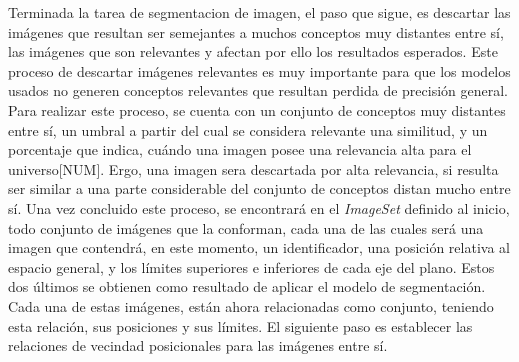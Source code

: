 Terminada la tarea de segmentacion de imagen, el paso que sigue, es descartar las imágenes que resultan ser semejantes a muchos conceptos muy distantes entre sí, las imágenes que son relevantes y afectan por ello los resultados esperados. Este proceso de descartar imágenes relevantes es muy importante para que los modelos usados no generen conceptos relevantes que resultan perdida de precisi\'on general. Para realizar este proceso, se cuenta con un conjunto de conceptos muy distantes entre sí, un umbral a partir del cual se considera relevante una similitud, y un porcentaje que indica, cu\'ando una imagen posee una relevancia alta para el universo[NUM]. Ergo, una imagen sera descartada por alta relevancia, si resulta ser similar a una parte considerable del conjunto de conceptos distan mucho entre s\'i.
Una vez concluido este proceso, se encontrará en el \textit{ImageSet} definido al inicio, todo conjunto de imágenes que la conforman, cada una de las cuales será una imagen que contendrá, en este momento, un identificador, una posición relativa al espacio general, y los límites superiores e inferiores de cada eje del plano. Estos dos últimos se obtienen como resultado de aplicar el modelo de segmentación. Cada una de estas imágenes, están ahora relacionadas como conjunto, teniendo esta relación, sus posiciones y sus límites. El siguiente paso es establecer las relaciones de vecindad posicionales para las imágenes entre s\'i.

